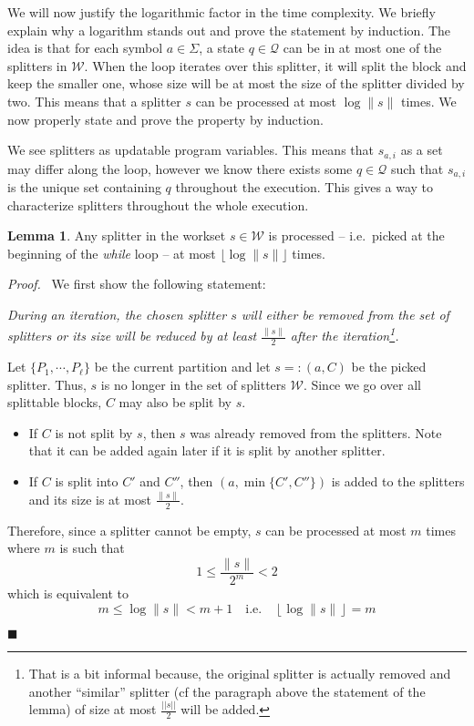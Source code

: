 \documentclass[12pt, a4 paper]{article}
\renewenvironment{proof}[1][Proof]{\begin{mdframed}[backgroundcolor=black!5, topline=false, rightline=false, bottomline=false, linecolor=black!15, linewidth=3pt]{\noindent\textit{#1.}\ }}{\noindent\par\hfill$\blacksquare$\end{mdframed}}
\theoremstyle{definition}
\newtheorem{lemma}{Lemma}
\begin{document}
We will now justify the logarithmic factor in the time complexity.
We briefly explain why a logarithm stands out and prove the statement by induction.
The idea is that for each symbol $a \in \Sigma$, a state $q \in \mathcal{Q}$ can be in at most one of the splitters in $\mathcal{W}$.
When the loop iterates over this splitter, it will split the block and keep the smaller one, whose size will be at most the size of the splitter divided by two.
This means that a splitter $s$ can be processed at most $\log \| s \|$ times.
We now properly state and prove the property by induction.

We see splitters as updatable program variables.
This means that $s_{a,i}$ as a set may differ along the loop, however we know there exists some $q \in \mathcal{Q}$ such that $s_{a,i}$ is the unique set containing $q$ throughout the execution.
This gives a way to characterize splitters throughout the whole execution.

\bigskip

\begin{lemma}\label{lem:log}
    Any splitter in the workset $s \in \mathcal{W}$ is processed -- i.e.\ picked at the beginning of the \textit{while} loop -- at most $\lfloor \log \| s \| \rfloor$ times.
\end{lemma}
\begin{proof}
    We first show the following statement:

    \textit{During an iteration, the chosen splitter $s$ will either be removed from the set of splitters or its size will be reduced by at least $\frac{\| s\|}{2}$ after the iteration\footnote{That is a bit informal because, the original splitter is actually removed and another ``similar'' splitter (cf the paragraph above the statement of the lemma) of size at most $\frac{||s||}{2}$ will be added.}.}

    \bigskip
    Let $\{P_1, \cdots, P_\ell\}$ be the current partition and let $s =: (a, C)$ be the picked splitter. Thus, $s$ is no longer in the set of splitters $\mathcal{W}$. Since we go over all splittable blocks, $C$ may also be split by $s$.
    \begin{itemize}
        \item If $C$ is not split by $s$, then $s$ was already removed from the splitters. Note that it can be added again later if it is split by another splitter.
        \item If $C$ is split into $C'$ and $C''$, then $(a, \min\{C', C''\})$ is added to the splitters and its size is at most $\frac{\| s \|}{2}$.
    \end{itemize}
    Therefore, since a splitter cannot be empty, $s$ can be processed at most $m$ times where $m$ is such that
    $$ 1 \leq \frac{\| s \|}{2^m} < 2$$
    which is equivalent to
    $$ m \leq \log \| s \| < m + 1 \quad \text{i.e.}\quad \left\lfloor\log \| s \|\right\rfloor = m $$
\end{proof}
\end{document}
